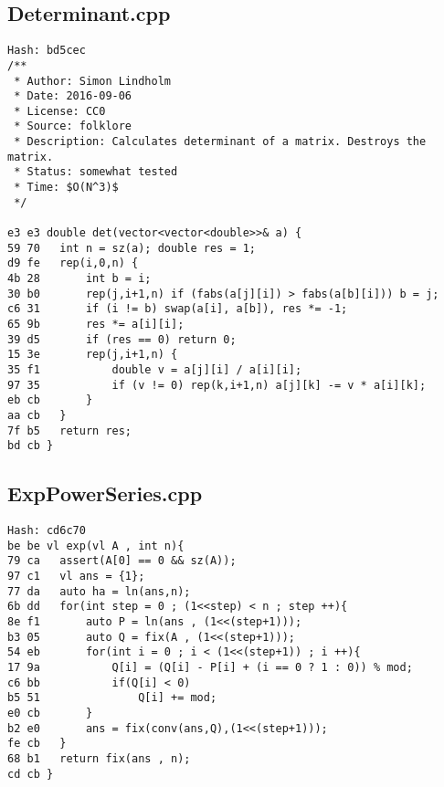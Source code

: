 \documentclass[11pt, a4paper, twoside]{article}
\begin{document}
\subsection{Determinant.cpp}
\begin{lstlisting}
Hash: bd5cec
/**
 * Author: Simon Lindholm
 * Date: 2016-09-06
 * License: CC0
 * Source: folklore
 * Description: Calculates determinant of a matrix. Destroys the matrix.
 * Status: somewhat tested
 * Time: $O(N^3)$
 */

e3 e3 double det(vector<vector<double>>& a) {
59 70 	int n = sz(a); double res = 1;
d9 fe 	rep(i,0,n) {
4b 28 		int b = i;
30 b0 		rep(j,i+1,n) if (fabs(a[j][i]) > fabs(a[b][i])) b = j;
c6 31 		if (i != b) swap(a[i], a[b]), res *= -1;
65 9b 		res *= a[i][i];
39 d5 		if (res == 0) return 0;
15 3e 		rep(j,i+1,n) {
35 f1 			double v = a[j][i] / a[i][i];
97 35 			if (v != 0) rep(k,i+1,n) a[j][k] -= v * a[i][k];
eb cb 		}
aa cb 	}
7f b5 	return res;
bd cb }
\end{lstlisting}

\subsection{ExpPowerSeries.cpp}
\begin{lstlisting}
Hash: cd6c70
be be vl exp(vl A , int n){
79 ca 	assert(A[0] == 0 && sz(A));
97 c1 	vl ans = {1};
77 da 	auto ha = ln(ans,n);
6b dd 	for(int step = 0 ; (1<<step) < n ; step ++){
8e f1 		auto P = ln(ans , (1<<(step+1)));
b3 05 		auto Q = fix(A , (1<<(step+1)));
54 eb 		for(int i = 0 ; i < (1<<(step+1)) ; i ++){
17 9a 			Q[i] = (Q[i] - P[i] + (i == 0 ? 1 : 0)) % mod;
c6 bb 			if(Q[i] < 0)
b5 51 				Q[i] += mod;
e0 cb 		}
b2 e0 		ans = fix(conv(ans,Q),(1<<(step+1)));
fe cb 	}
68 b1 	return fix(ans , n);
cd cb }
\end{lstlisting}
\end{document}
